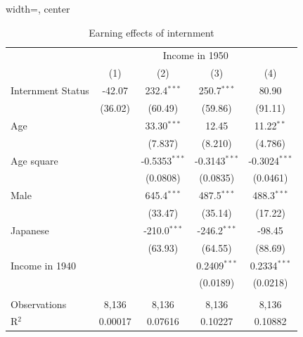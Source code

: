 \begin{table}[htbp]
   \caption{\label{tbl:reg1} Earning effects of internment}
   \begin{adjustbox}{width=\textwidth, center}
   \begin{tabular}{lcccc}
      \toprule
       & \multicolumn{4}{c}{Income in 1950}\\
                                   & (1)     & (2)             & (3)             & (4)\\  
      \midrule 
      Internment Status            & -42.07  & 232.4$^{***}$   & 250.7$^{***}$   & 80.90\\   
                                   & (36.02) & (60.49)         & (59.86)         & (91.11)\\   
      Age                          &         & 33.30$^{***}$   & 12.45           & 11.22$^{**}$\\   
                                   &         & (7.837)         & (8.210)         & (4.786)\\   
      Age square                   &         & -0.5353$^{***}$ & -0.3143$^{***}$ & -0.3024$^{***}$\\   
                                   &         & (0.0808)        & (0.0835)        & (0.0461)\\   
      Male                         &         & 645.4$^{***}$   & 487.5$^{***}$   & 488.3$^{***}$\\   
                                   &         & (33.47)         & (35.14)         & (17.22)\\   
      Japanese                     &         & -210.0$^{***}$  & -246.2$^{***}$  & -98.45\\   
                                   &         & (63.93)         & (64.55)         & (88.69)\\   
      Income in 1940               &         &                 & 0.2409$^{***}$  & 0.2334$^{***}$\\   
                                   &         &                 & (0.0189)        & (0.0218)\\   
       \\
      Observations                 & 8,136   & 8,136           & 8,136           & 8,136\\  
      R$^2$                        & 0.00017 & 0.07616         & 0.10227         & 0.10882\\  

\end{tabular}
\end{adjustbox}
\end{table}
